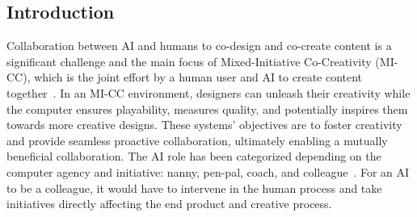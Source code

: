 \subsection{Introduction}

Collaboration between AI and humans to co-design and co-create content is a significant challenge and the main focus of Mixed-Initiative Co-Creativity (MI-CC), which is the joint effort by a human user and AI to create content together~. In an MI-CC environment, designers can unleash their creativity while the computer ensures playability, measures quality, and potentially inspires them towards more creative designs. These systems' objectives are to foster creativity and provide seamless proactive collaboration, ultimately enabling a mutually beneficial collaboration. The AI role has been categorized depending on the computer agency and initiative: nanny, pen-pal, coach, and colleague~. For an AI to be a colleague, it would have to intervene in the human process and take initiatives directly affecting the end product and creative process.



 



